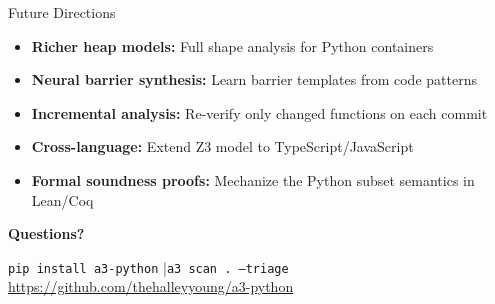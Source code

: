 \documentclass[aspectratio=169]{beamer}
\begin{document}
\begin{frame}{Future Directions}

\begin{itemize}
  \item \textbf{Richer heap models:} Full shape analysis for Python containers
  \item \textbf{Neural barrier synthesis:} Learn barrier templates from code patterns
  \item \textbf{Incremental analysis:} Re-verify only changed functions on each commit
  \item \textbf{Cross-language:} Extend Z3 model to TypeScript/JavaScript
  \item \textbf{Formal soundness proofs:} Mechanize the Python subset semantics in Lean/Coq
\end{itemize}

\vspace{1em}
\begin{center}
\Large\textbf{Questions?}
\end{center}

\vspace{0.5em}
\begin{center}
\texttt{pip install a3-python} \quad|\quad \texttt{a3 scan . --triage}\\[0.3em]
\small\url{https://github.com/thehalleyyoung/a3-python}
\end{center}

\end{frame}
\end{document}

